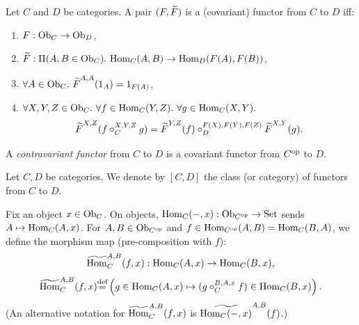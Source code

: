 \documentclass[10pt,a4paper]{article}
\begin{document}
\begin{definition}\label{def:functor}
Let $C$ and $D$ be categories. A pair $(F, {\widetilde{F}\textrm{}})$ is a (covariant) functor from $C$ to $D$ iff:
\begin{enumerate}
\item $F : {\textrm{Ob}}_C \to {\textrm{Ob}}_D$,
\item $\FMor : \Pi(A, B \in \Ob_C).\ \Hom_C(A,B) \to \Hom_D(F(A), F(B))$,
\item $\forall A\in \Ob_C.\ \FMor^{A,A}(1_A)=1_{F(A)}$,
\item $\forall X,Y,Z \in {\textrm{Ob}}_C.\ \forall f\in{\textrm{Hom}}_C(Y,Z).\ \forall g\in{\textrm{Hom}}_C(X,Y).$
$${\widetilde{F}\textrm{}}^{X,Z}(f\circ_C^{X,Y,Z} g)={\widetilde{F}\textrm{}}^{Y,Z}(f)\circ_D^{F(X),F(Y),F(Z)} {\widetilde{F}\textrm{}}^{X,Y}(g).$$
\end{enumerate}
A \emph{contravariant functor} from $C$ to $D$ is a covariant functor from $C^{\textrm{op}}$ to $D$.
\end{definition}

\begin{definition}
Let $C, D$ be categories. We denote by $[C,D]$ the class (or category) of functors from $C$ to $D$.
\end{definition}

\begin{definition}\label{def:hommor}
Fix an object $x \in {\textrm{Ob}}_C$. On objects, ${\textrm{Hom}}_C(-,x) : {\textrm{Ob}}_{C^{\textrm{op}}} \to {\textrm{Set}}$ sends $A \mapsto {\textrm{Hom}}_C(A,x)$.
For $A,B \in {\textrm{Ob}}_{C^{\textrm{op}}}$ and $f \in {\textrm{Hom}}_{C^{\textrm{op}}}(A,B) = {\textrm{Hom}}_C(B,A)$, we define the morphism map (pre-composition with $f$):
$${\widetilde{{\textrm{Hom}}}\textrm{}}^{A,B}_C(f,x) : {\textrm{Hom}}_C(A,x) \to {\textrm{Hom}}_C(B,x),$$
$${\widetilde{{\textrm{Hom}}}\textrm{}}^{A,B}_C(f,x) {\stackrel{{\textrm{def}}}{=}} \left(g \in {\textrm{Hom}}_C(A,x) \mapsto (g \circ_C^{B,A,x} f) \in {\textrm{Hom}}_C(B,x)\right).$$
(An alternative notation for ${\widetilde{{\textrm{Hom}}}\textrm{}}^{A,B}_C(f,x)$ is $\widetilde{{\textrm{Hom}}_C(-,x)}^{A,B}(f)$.)
\end{definition}
\end{document}
